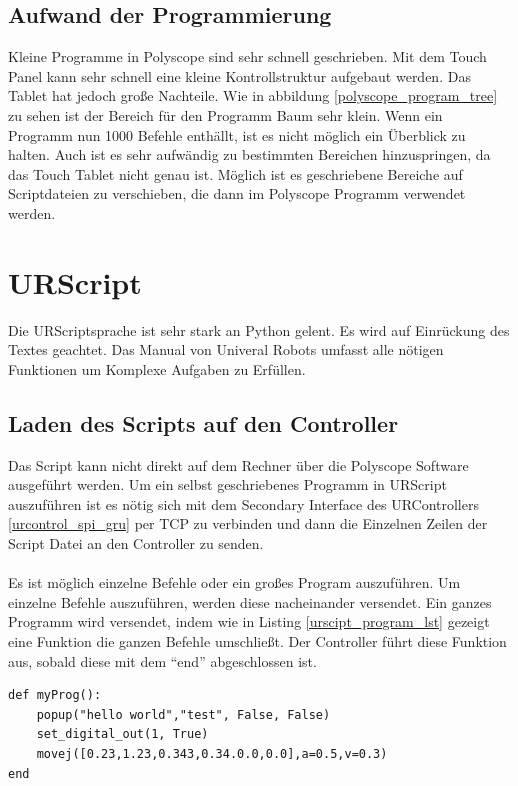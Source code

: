 \subsection{Aufwand der Programmierung}
\label{polyscope_aufwand}

Kleine Programme in Polyscope sind sehr schnell geschrieben. Mit dem Touch Panel kann sehr schnell eine kleine Kontrollstruktur aufgebaut werden. Das Tablet hat jedoch große Nachteile. Wie in abbildung \ref{polyscope_program_tree} zu sehen ist der Bereich für den Programm Baum sehr klein. Wenn ein Programm nun 1000 Befehle enthällt, ist es nicht möglich ein Überblick zu halten. Auch ist es sehr aufwändig zu bestimmten Bereichen hinzuspringen, da das Touch Tablet nicht genau ist. Möglich ist es geschriebene Bereiche auf Scriptdateien zu verschieben, die dann im Polyscope Programm verwendet werden. 

\section{URScript}
\label{sec:ur_script_rel}

Die URScriptsprache ist sehr stark an Python gelent. Es wird auf Einrückung des Textes geachtet.
Das Manual von Univeral Robots umfasst alle nötigen Funktionen um Komplexe Aufgaben zu Erfüllen.

\subsection{Laden des Scripts auf den Controller}
\label{load_script_rel}

Das Script kann nicht direkt auf dem Rechner über die Polyscope Software ausgeführt werden. Um ein selbst geschriebenes Programm in URScript auszuführen ist es nötig sich mit dem Secondary Interface des URControllers \ref{urcontrol_spi_gru} per TCP zu verbinden und dann die Einzelnen Zeilen der Script Datei an den Controller zu senden.
\\\\
Es ist möglich einzelne Befehle oder ein großes Program auszuführen. Um einzelne Befehle auszuführen, werden diese nacheinander versendet.
Ein ganzes Programm wird versendet, indem wie in Listing \ref{urscipt_program_lst} gezeigt eine Funktion die ganzen Befehle umschließt. Der Controller führt diese Funktion aus, sobald diese mit dem ``end'' abgeschlossen ist.

\begin{lstlisting}[caption={Kleines Beispielprogram in URScript}, label=lst:urscipt_program_lst ,captionpos=b] 
def myProg():
	popup("hello world","test", False, False)
	set_digital_out(1, True)
	movej([0.23,1.23,0.343,0.34.0.0,0.0],a=0.5,v=0.3)
end
\end{lstlisting}


